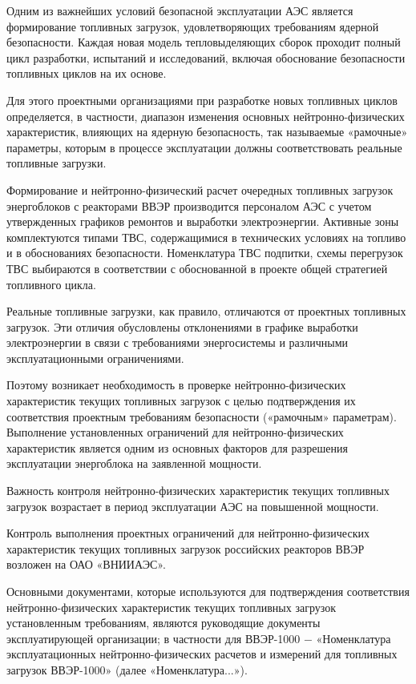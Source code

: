 \documentclass[14pt]{article}
\begin{document}
	
	Одним из важнейших условий безопасной эксплуатации АЭС является формирование топливных  загрузок,  удовлетворяющих  требованиям  ядерной  безопасности.  Каждая  новая модель  тепловыделяющих  сборок  проходит  полный  цикл разработки,  испытаний  и исследований, включая обоснование безопасности топливных циклов на их основе.  
	
	Для  этого  проектными  организациями  при  разработке  новых  топливных  циклов определяется,   в   частности,   диапазон   изменения   основных   нейтронно-физических характеристик, влияющих на ядерную безопасность, так называемые «рамочные» параметры, которым в процессе эксплуатации должны соответствовать реальные топливные загрузки. 
	
	Формирование  и  нейтронно-физический  расчет  очередных  топливных  загрузок энергоблоков  с  реакторами  ВВЭР  производится  персоналом  АЭС  с  учетом  утвержденных графиков  ремонтов  и  выработки  электроэнергии.  Активные  зоны  комплектуются  типами ТВС,  содержащимися  в  технических  условиях  на  топливо  и  в  обоснованиях  безопасности. Номенклатура  ТВС  подпитки,  схемы  перегрузок  ТВС  выбираются  в  соответствии  с обоснованной в проекте общей стратегией топливного цикла. 
	
	Реальные  топливные  загрузки,  как  правило,  отличаются  от  проектных  топливных загрузок.  Эти  отличия  обусловлены  отклонениями  в  графике  выработки  электроэнергии  в связи с требованиями энергосистемы и различными эксплуатационными ограничениями. 
	
	Поэтому  возникает  необходимость  в  проверке  нейтронно-физических  характеристик текущих   топливных   загрузок   с   целью   подтверждения   их   соответствия   проектным требованиям   безопасности   («рамочным»   параметрам).   Выполнение   установленных ограничений  для  нейтронно-физических  характеристик является  одним  из  основных факторов для разрешения эксплуатации энергоблока на заявленной мощности. 
	
	Важность   контроля   нейтронно-физических   характеристик   текущих   топливных загрузок возрастает в период эксплуатации АЭС на повышенной мощности.  
	
	Контроль    выполнения    проектных    ограничений    для    нейтронно-физических характеристик текущих топливных загрузок российских реакторов ВВЭР возложен на ОАО «ВНИИАЭС».
	
	Основными  документами,  которые  используются  для  подтверждения  соответствия нейтронно-физических   характеристик   текущих   топливных   загрузок   установленным требованиям, являются руководящие документы эксплуатирующей организации; в частности для  ВВЭР-1000 −  «Номенклатура  эксплуатационных  нейтронно-физических  расчетов  и измерений для топливных загрузок ВВЭР-1000» (далее «Номенклатура...»). 
	
\end{document}
